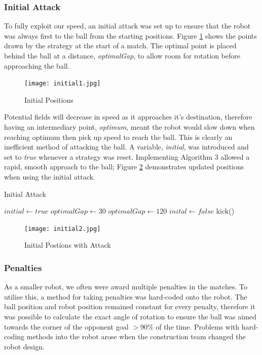 \subsubsection{Initial Attack}
To fully exploit our speed, an initial attack was set up to ensure that the robot was always first to the ball from the starting positions. Figure \ref{fig:initial1} shows the points drawn by the strategy at the start of a match. The optimal point is placed behind the ball at a distance, \textit{optimalGap}, to allow room for rotation before approaching the ball.

\begin{figure}[htp]
\begin{center}
\leavevmode
\texttt{[image: initial1.jpg]}
\end{center}
\caption{Initial Positions}
\label{fig:initial1}
\end{figure}

Potential fields will decrease in speed as it approaches it's destination, therefore having an intermediary point, \textit{optimum}, meant the robot would slow down when reaching optimum then pick up speed to reach the ball. This is clearly an inefficient method of attacking the ball. A variable, \textit{initial}, was introduced and set to \textit{true} whenever a strategy was reset. Implementing Algorithm 3 allowed a rapid, smooth approach to the ball; Figure \ref{fig:initial2} demonstrates updated positions when using the initial attack. \linebreak

\begin{algorithm}
\caption{Initial Attack}
\begin{algorithmic}[1]
\STATE $initial\gets true$
			\STATE $optimalGap\gets 30$
		\ELSE
			\STATE $optimalGap\gets 120$
			\STATE $inital\gets false$
			\STATE kick()
		\ENDIF
	\ENDIF
\ENDWHILE
\end{algorithmic}
\end{algorithm}

\begin{figure}[htp]
\begin{center}
\leavevmode
\texttt{[image: initial2.jpg]}
\end{center}
\caption{Initial Postions with Attack}
\label{fig:initial2}
\end{figure}

\subsubsection{Penalties}
As a smaller robot, we often were award multiple penalties in the matches. To utilise this, a method for taking penalties was hard-coded onto the robot. The ball position and robot position remained constant for every penalty, therefore it was possible to calculate the exact angle of rotation to ensure the ball was aimed towards the corner of the opponent goal $>$90\% of the time. Problems with hard-coding methods into the robot arose when the construction team changed the robot design. \linebreak

